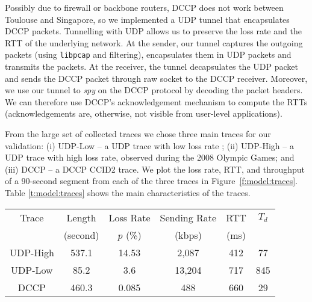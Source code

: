 Possibly due to firewall or backbone routers, DCCP does not work between Toulouse and Singapore,
so we implemented a UDP tunnel that encapsulates
DCCP packets.
%
Tunnelling with UDP 
allows us to preserve the loss rate and the RTT of the underlying network.
At the sender, our tunnel captures the outgoing packets (using \texttt{libpcap} and filtering),
encapsulates them in UDP packets and transmits the packets.  At the receiver, 
the tunnel decapsulates the UDP packet and sends the DCCP packet through raw socket
to the DCCP receiver.  %
    Moreover, we use our tunnel to \emph{spy} on the DCCP protocol by decoding
    the packet headers. We can therefore use DCCP's acknowledgement
    mechanism to compute the RTTs (acknowledgements are,
    otherwise, not visible from user-level applications).

    From the large set of collected traces we chose three main traces for our validation:
 (i) \textsf{UDP-Low} -- a UDP trace with low loss rate ;
(ii) \textsf{UDP-High} --  a UDP trace with high loss rate, observed during the 2008 Olympic Games; and 
(iii) \textsf{DCCP} -- a DCCP CCID2 trace. We plot the loss rate, RTT, and throughput of a 90-second segment from each of the three traces in Figure~\ref{f:model:traces}.  
Table \ref{t:model:traces} shows the main characteristics of the traces.

\begin{table*}[htb!]
\centering
\begin{tabular}{|c|c|c|c|c|c|}
\hline
Trace    & Length  & Loss Rate& Sending Rate & RTT & $T_d$\\
         & (second)&     $p$ (\%)         &   (kbps)              & (ms) & \\
\hline
\textsf{UDP-High} &  537.1  &  14.53    &  2,087 & 412 & 77\\
\textsf{UDP-Low}  &  85.2   &  3.6      & 13,204 & 717 & 845\\
\textsf{DCCP}     &  460.3  &  0.085    &    488 & 660 & 29\\
\hline
\end{tabular}
\caption{Main characteristics of the transmission traces.}
\label{t:model:traces}
\end{table*}

